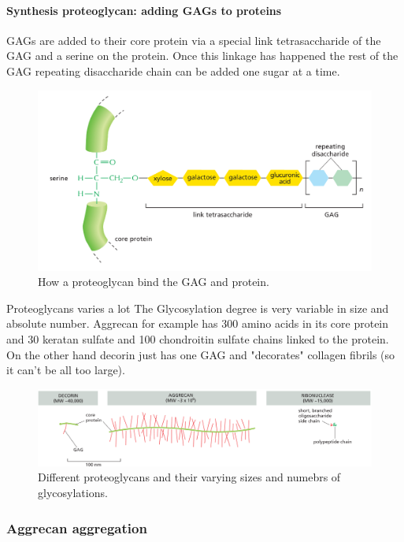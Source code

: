 \documentclass[../main.tex]{subfiles}
\begin{document}
\paragraph{Synthesis proteoglycan: adding GAGs to proteins}

GAGs are added to their core protein via a special link tetrasaccharide of the GAG and a serine on the protein. Once this linkage has happened the rest of the GAG repeating disaccharide chain can be added one sugar at a time. 

\begin{figure}[H]
	\centering
	\includegraphics[width=0.7\linewidth]{gag_bond}
	\caption{How a proteoglycan bind the GAG and protein.}
	\label{fig:gagbond}
\end{figure}

\begin{RemarkWithTitel}{Proteoglycans varies a lot}
	The Glycosylation degree is very variable in size and absolute number. Aggrecan for example has 300 amino acids in its core protein and 30 keratan sulfate and 100 chondroitin sulfate chains linked to the protein. On the other hand decorin just has one GAG and "decorates" collagen fibrils (so it can't be all too large).
	
	\begin{figure}[H]
		\centering
		\includegraphics[width=0.7\linewidth]{gag_ex}
		\caption{Different proteoglycans and their varying sizes and numebrs of glycosylations.}
		\label{fig:gagex}
	\end{figure}
	
\end{RemarkWithTitel}

\subsubsection{Aggrecan aggregation}
\end{document}
